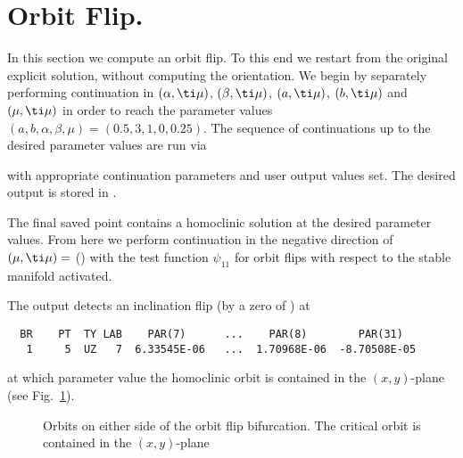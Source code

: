 \documentclass[12pt]{report}
\begin{document}
\section{Orbit Flip.}
In this section we compute an orbit flip. To this end we restart
from the original explicit solution, without computing the orientation. We 
begin by separately performing continuation in $(\alpha,\ti \mu)$, 
$(\beta,\ti \mu)$, $(a,\ti \mu)$, $(b,\ti \mu)$ and $(\mu, \ti \mu)$
in order to reach the parameter values 
$(a,b,\alpha,\beta, \mu)=(0.5,3,1,0,0.25)$.
The sequence of continuations up to the desired parameter values 
are run via
\begin{center}
\end{center}
with appropriate continuation parameters and user output values
set. The desired output is stored in .

The final saved point  contains a homoclinic solution at
the desired parameter values. From here we perform continuation in
the negative direction of $(\mu,\ti \mu)=$ () with
the test function $\psi_{11}$ for orbit flips with respect to the
stable manifold activated.
\begin{center}
\end{center}
The output detects an inclination flip (by a zero of ) 
at  
\begin{verbatim}
  BR    PT  TY LAB    PAR(7)      ...    PAR(8)        PAR(31)    
   1     5  UZ   7  6.33545E-06   ...  1.70968E-06  -8.70508E-05
\end{verbatim}
at which parameter value the homoclinic orbit is contained in the $(x,y)$-plane
(see Fig.\ \ref{Ftest2}).

\begin{figure}[t]
\epsfysize 9.0cm
\centerline{}
\caption{Orbits on either side of the orbit flip bifurcation. The critical
orbit is contained in the $(x,y)$-plane}
\label{Ftest2}
\end{figure}
\end{document}

